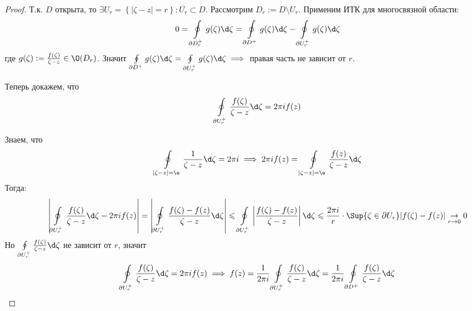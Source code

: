 \begin{proof}
  Т.к. $D$ открыта, то $\exists U_r = \left\{|\zeta - z|=r\right\}\colon \overline{U_r}\subset D$. Рассмотрим $D_r:=D\setminus U_r$. Применим ИТК для многосвязной области:
  \[0=\oint\limits_{\partial D_r^+}g(\zeta)\d \zeta = \oint\limits_{\partial D^+}g(\zeta)\d \zeta - \oint\limits_{\partial U_r^+}g(\zeta)\d \zeta\]
  где $g(\zeta):=\frac{f(\zeta)}{\zeta-z}\in \O(D_r)$. Значит $\oint\limits_{\partial D^+}g(\zeta)\d \zeta = \oint\limits_{\partial U_r^+}g(\zeta)\d \zeta\implies$ правая часть не зависит от $r$.

  Теперь докажем, что
  \[\oint\limits_{\partial U_r^+}\frac{f(\zeta)}{\zeta-z}\d \zeta=2\pi i f(z)\]

  Знаем, что
  \[\oint\limits_{|\zeta-z|=\e}\frac{1}{\zeta-z}\d \zeta = 2\pi i\implies 2\pi i f(z) = \oint\limits_{|\zeta-z|=\e}\frac{f(z)}{\zeta-z}\d \zeta\]
  Тогда:
  \[\left|\oint\limits_{\partial U_r^+}\frac{f(\zeta)}{\zeta-z}\d \zeta-2\pi i f(z)\right|=\left|\oint\limits_{\partial U_r^+}\frac{f(\zeta) - f(z)}{\zeta-z}\d \zeta\right|\leqslant \oint\limits_{\partial U_r^+}\left|\frac{f(\zeta) - f(z)}{\zeta-z}\right|\d \zeta\leqslant \frac{2\pi i}{r}\cdot \Sup{\zeta \in \partial U_r} |f(\zeta)-f(z)|\underset{r\to0}{\to}0\]
  Но $\oint\limits_{\partial U_r^+}\frac{f(\zeta)}{\zeta-z}\d \zeta$ не зависит от $r$, значит
  \[\oint\limits_{\partial U_r^+}\frac{f(\zeta)}{\zeta-z}\d \zeta=2\pi i f(z)\implies f(z) = \frac{1}{2\pi i}\oint\limits_{\partial U_r^+}\frac{f(\zeta)}{\zeta-z}\d \zeta=\frac{1}{2\pi i}\oint\limits_{\partial D^+}\frac{f(\zeta)}{\zeta-z}\d \zeta\]
\end{proof}
